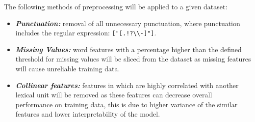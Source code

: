 The following methods of preprocessing will be applied to a given dataset:

\begin{itemize}
    \item \textbf{\textit{Punctuation:}} removal of all unnecessary punctuation, where punctuation includes the regular expression: \verb|["[.!?\\-]"]|.
    \item \textbf{\textit{Missing Values:}} word features with a percentage higher than the defined threshold for missing values will be sliced from the dataset as missing features will cause unreliable training data.
    \item \textbf{\textit{Collinear features:}} features in which are highly correlated with another lexical unit will be removed as these features can decrease overall performance on training data, this is due to higher variance of the similar features and lower interpretability of the model.
\end{itemize}